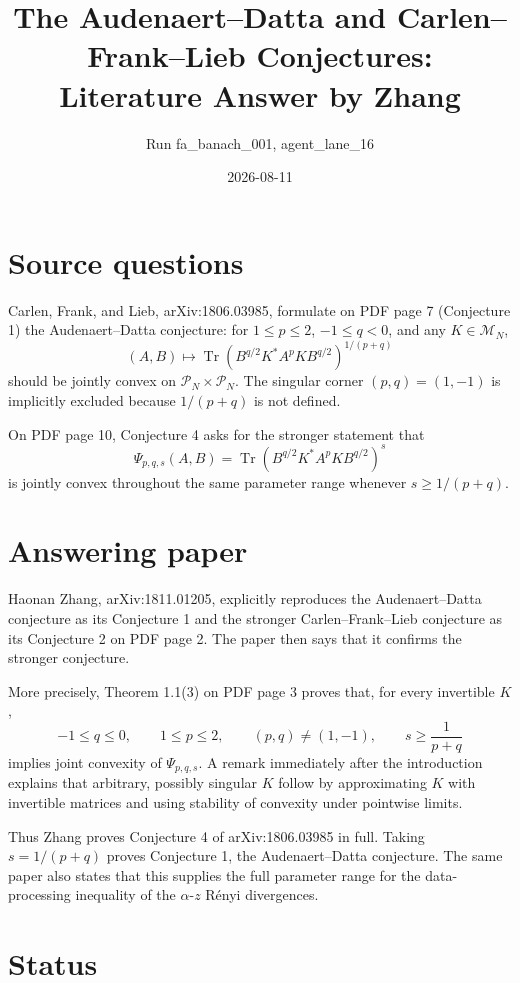 \documentclass[11pt]{article}
\title{The Audenaert--Datta and Carlen--Frank--Lieb Conjectures:\\
Literature Answer by Zhang}
\author{Run fa\_banach\_001, agent\_lane\_16}
\date{2026-08-11}
\newcommand{\Pp}{\mathcal P_N}
\newcommand{\M}{\mathcal M_N}
\begin{document}
\maketitle

\section*{Source questions}

Carlen, Frank, and Lieb, arXiv:1806.03985, formulate on PDF page 7
(Conjecture 1) the Audenaert--Datta conjecture: for
\(1\le p\le2\), \(-1\le q<0\), and any \(K\in\M\),
\[
 (A,B)\longmapsto
 \operatorname{Tr}\left(B^{q/2}K^*A^pKB^{q/2}\right)^{1/(p+q)}
\]
should be jointly convex on \(\Pp\times\Pp\).  The singular corner
\((p,q)=(1,-1)\) is implicitly excluded because \(1/(p+q)\) is not
defined.

On PDF page 10, Conjecture 4 asks for the stronger statement that
\[
 \Psi_{p,q,s}(A,B)=
 \operatorname{Tr}\left(B^{q/2}K^*A^pKB^{q/2}\right)^s
\]
is jointly convex throughout the same parameter range whenever
\(s\ge1/(p+q)\).

\section*{Answering paper}

Haonan Zhang, arXiv:1811.01205, explicitly reproduces the
Audenaert--Datta conjecture as its Conjecture 1 and the stronger
Carlen--Frank--Lieb conjecture as its Conjecture 2 on PDF page 2.  The paper
then says that it confirms the stronger conjecture.

More precisely, Theorem 1.1(3) on PDF page 3 proves that, for every invertible
\(K\),
\[
 -1\le q\le0,\qquad 1\le p\le2,\qquad (p,q)\ne(1,-1),
 \qquad s\ge\frac1{p+q}
\]
implies joint convexity of \(\Psi_{p,q,s}\).  A remark immediately after the
introduction explains that arbitrary, possibly singular \(K\) follow by
approximating \(K\) with invertible matrices and using stability of convexity
under pointwise limits.

Thus Zhang proves Conjecture 4 of arXiv:1806.03985 in full.  Taking
\(s=1/(p+q)\) proves Conjecture 1, the Audenaert--Datta conjecture.  The same
paper also states that this supplies the full parameter range for the
data-processing inequality of the \(\alpha\)-\(z\) R\'enyi divergences.

\section*{Status}
\end{document}
